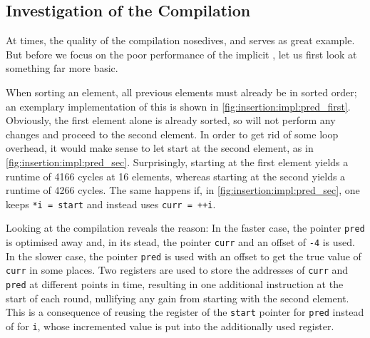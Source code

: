 \subsection*{Investigation of the Compilation}
\label{sec:tasklet:insertion:compilation}

At times, the quality of the compilation nosedives, and \IS{} serves as great example.
But before we focus on the poor performance of the implicit \IS{}, let us first look at something far more basic.

When sorting an element, all previous elements must already be in sorted order;
an exemplary implementation of this is shown in \cref{fig:insertion:impl:pred_first}.
Obviously, the first element alone is already sorted, so \IS{} will not perform any changes and proceed to the second element.
In order to get rid of some loop overhead, it would make sense to let \IS{} start at the second element, as in \cref{fig:insertion:impl:pred_sec}.
Surprisingly, starting at the first element yields a runtime of 4166 cycles at 16 elements, whereas starting at the second yields a runtime of 4266 cycles.
The same happens if, in \cref{fig:insertion:impl:pred_sec}, one keeps \lstinline|*i = start| and instead uses \lstinline|curr = ++i|.

Looking at the compilation reveals the reason:
In the faster case, the pointer \lstinline|pred| is optimised away and, in its stead, the pointer \lstinline|curr| and an offset of \lstinline|-4| is used.
In the slower case, the pointer \lstinline|pred| is used with an offset to get the true value of \lstinline|curr| in some places.
Two registers are used to store the addresses of \lstinline|curr| and \lstinline|pred| at different points in time, resulting in one additional instruction at the start of each round, nullifying any gain from starting with the second element.
This is a consequence of reusing the register of the \lstinline|start| pointer for \lstinline|pred| instead of for \lstinline|i|, whose incremented value is put into the additionally used register.

